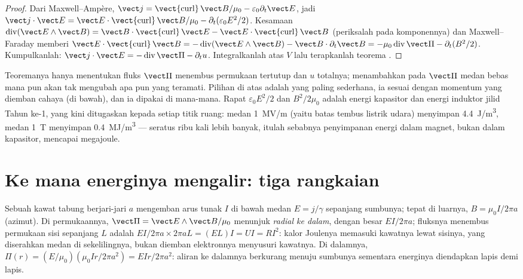 \begin{proof}
Dari Maxwell--Ampère, $\vect j = \operatorname{\vect{curl}}\vect B/\mu_0 - \varepsilon_0\partial_t
\vect E$, jadi $\vect j\cdot\vect E = \vect E\cdot\operatorname{\vect{curl}}\vect B/\mu_0 -
\partial_t(\varepsilon_0E^2/2)$. Kesamaan $\operatorname{div}(\vect E\wedge\vect B) = \vect B
\cdot\operatorname{\vect{curl}}\vect E - \vect E\cdot\operatorname{\vect{curl}}\vect B$ (periksalah
pada komponennya) dan Maxwell--Faraday memberi $\vect E\cdot\operatorname{\vect{curl}}
\vect B = -\operatorname{div}(\vect E\wedge\vect B) - \vect B\cdot\partial_t\vect B = -\mu_0
\operatorname{div}\vect\Pi - \partial_t(B^2/2)$. Kumpulkanlah: $\vect j\cdot\vect E = -\operatorname{div}
\vect\Pi - \partial_tu$. Integralkanlah atas $V$ lalu terapkanlah teorema .
\end{proof}

\begin{remark}\label{rem:b2:poynting-vector:interpretation}
Teoremanya hanya menentukan fluks $\vect\Pi$ menembus permukaan tertutup
dan $u$ totalnya; menambahkan pada $\vect\Pi$ medan bebas  mana pun akan
tak mengubah apa pun yang teramati. Pilihan di atas adalah yang paling sederhana, ia
sesuai dengan momentum yang diemban cahaya (di bawah), dan ia
dipakai di mana-mana. Rapat $\varepsilon_0E^2/2$ dan $B^2/2\mu_0$ adalah
energi kapasitor dan energi induktor jilid Tahun ke-1,
yang kini ditugaskan kepada setiap titik ruang: medan \qty{1}{MV/m} (yaitu
batas tembus listrik udara) menyimpan \qty{4.4}{J/m^3}, medan \qty{1}{T}
menyimpan \qty{0.4}{MJ/m^3} --- seratus ribu kali lebih banyak, itulah sebabnya
penyimpanan energi dalam magnet, bukan dalam kapasitor, mencapai megajoule.
\end{remark}

\section{Ke mana energinya mengalir: tiga rangkaian}

\begin{example}\label{ex:b2:poynting-vector:wire}
Sebuah kawat tabung berjari-jari $a$ mengemban arus tunak $I$ di bawah
medan $E = j/\gamma$ sepanjang sumbunya; tepat di luarnya, $B = \mu_0I/2\pi a$
(azimut). Di permukaannya, $\vect\Pi = \vect E\wedge\vect B/\mu_0$ menunjuk
\emph{radial ke dalam}, dengan besar $EI/2\pi a$; fluksnya menembus
permukaan sisi sepanjang $L$ adalah $EI/2\pi a\times2\pi aL = (EL)I = UI =
RI^2$: kalor Joulenya memasuki kawatnya lewat sisinya, yang diserahkan
medan di sekelilingnya, bukan diemban elektronnya menyusuri kawatnya.
Di dalamnya, $\Pi(r) = (E/\mu_0)(\mu_0Ir/2\pi a^2) = EIr/2\pi a^2$: aliran ke dalamnya
berkurang menuju sumbunya sementara energinya diendapkan lapis demi lapis.
\end{example}

